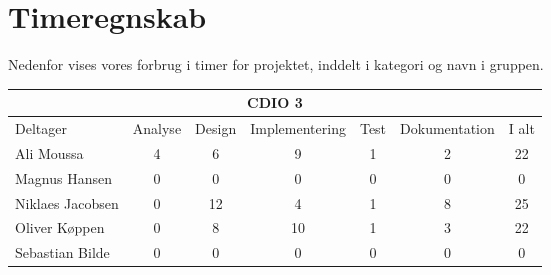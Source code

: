 \chapter{Timeregnskab}

Nedenfor vises vores forbrug i timer for projektet, inddelt i kategori og navn i gruppen.

\begin{table}[h]
    \centering
        \begin{tabular}{|l|c|c|c|c|c|c|}
                \hline
            \multicolumn{7}{|c|}{CDIO 3}

                \\ \hline
                                Deltager            &       Analyse      &       Design      &      Implementering    &      Test     &       Dokumentation        &       I alt
                \\ \hline

                                Ali Moussa         &         4        &           6        &            9           &        1      &             2              &          22
                \\ \hline

                                Magnus Hansen      &         0        &            0        &             0           &        0      &             0              &          0
                \\ \hline

                                Niklaes Jacobsen   &         0        &            12       &             4           &        1      &             8              &          25
                \\ \hline

                                Oliver Køppen      &         0        &             8        &             10           &        1      &             3              &          22
                \\ \hline

                                Sebastian Bilde    &         0        &             0        &             0           &        0      &             0              &          0
                \\ \hline

        \end{tabular}
\end{table}